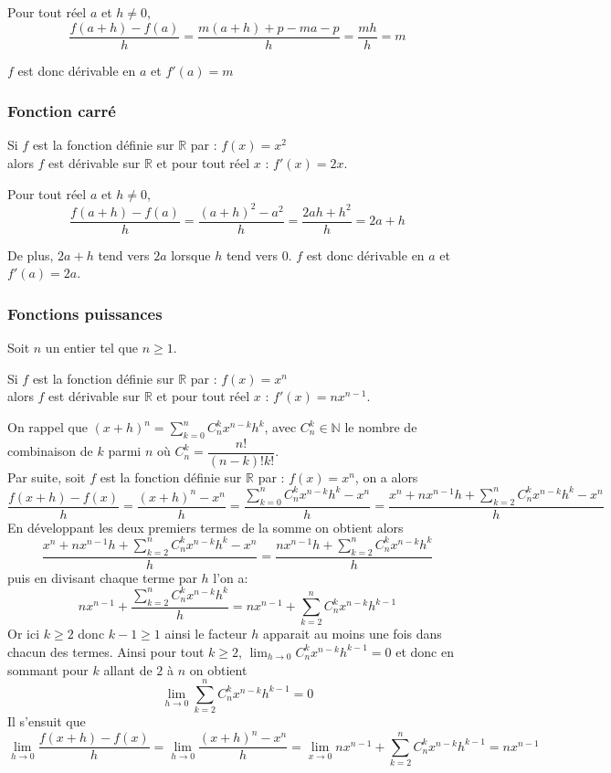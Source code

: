 \documentclass[french]{book}
\newcommand{\R}{\mathbb {R}}
\newcommand{\N}{\mathbb {N}}
\newcommand{\se}{\geq}
\newcommand{\ds}{\displaystyle}
\newcommand{\limo}[1][x]{\ds\lim_{#1\rightarrow 0}}
\begin{document}
\begin{demo}
Pour tout réel $a$ et $h\neq 0$,
\[\dfrac{f(a+h)-f(a)}{h}=\dfrac{m(a+h)+p-ma-p}{h}=\dfrac{mh}{h}=m\]

$f$ est donc dérivable en $a$ et $f'(a)=m$
\end{demo}

\subsubsection*{Fonction carré}
\begin{prop}
Si $f$ est la fonction définie sur $\R$ par :  $f(x)=x^{2}$ \\
alors $f$ est dérivable sur $\R$ et pour tout réel $x$ :  $f'(x)=2x$.

\end{prop}

\begin{demo}
Pour tout réel $a$ et $h\neq 0$,
\[\dfrac{f(a+h)-f(a)}{h}=\dfrac{(a+h)^{2}-a^{2}}{h}=\dfrac{2ah+h^{2}}{h}=2a+h\]

De plus, $2a+h$ tend vers $2a$ lorsque $h$ tend vers 0.
$f$ est donc dérivable en $a$ et $f'(a)=2a$.
\end{demo}

\subsubsection*{Fonctions puissances}
\begin{prop}
Soit $n$ un entier tel que $n \se 1$.

Si $f$ est la fonction définie sur $\R$ par :  $f(x)=x^{n}$ \\
alors $f$ est dérivable sur $\R$ et pour tout réel $x$ :  $f'(x)=nx^{n-1}$.

\end{prop}

\begin{demo}
On rappel que $(x+h)^n=\sum^n_{k=0} C^k_n x^{n-k}h^k$, avec $ C^k_n \in \N$ le nombre de combinaison de $k$ parmi $n$ où $C^k_n=\dfrac{n!}{(n-k)!k!}$.\\

Par suite,  soit $f$ est la fonction définie sur $\R$ par :  $f(x)=x^{n}$, on a alors 
$$\dfrac{f(x+h)-f(x)}{h}=\dfrac{(x+h)^n -x^n }{h}=\dfrac{\sum^n_{k=0} C^k_n x^{n-k}h^k -x^n}{h}= \dfrac{x^n+nx^{n-1}h+\sum^n_{k=2} C^k_n x^{n-k}h^k -x^n}{h}$$
En développant les deux premiers termes de la somme on obtient alors
$$\dfrac{x^n+nx^{n-1}h+\sum^n_{k=2} C^k_n x^{n-k}h^k -x^n}{h}=\dfrac{nx^{n-1}h+\sum^n_{k=2} C^k_n x^{n-k}h^k}{h}$$
puis en divisant chaque terme par $h$ l'on a:
$$nx^{n-1}+ \dfrac{\sum^n_{k=2} C^k_n x^{n-k}h^k}{h}=nx^{n-1}+\sum^n_{k=2} C^k_n x^{n-k}h^{k-1}$$
Or ici $k\se2$ donc $k-1\se1$ ainsi le facteur $h$ apparait au moins une fois dans chacun des termes. Ainsi pour tout $k\se2$,  $\limo[h] C^k_n x^{n-k}h^{k-1} = 0$ et donc en sommant pour $k$ allant de $2$ à $n$ on obtient
$$\limo[h]  \sum^n_{k=2} C^k_n x^{n-k}h^{k-1}=0$$
Il s'ensuit que 
$$ \limo[h] \dfrac{f(x+h)-f(x)}{h}=\limo[h] \dfrac{(x+h)^n -x^n }{h}= \limo nx^{n-1}+\sum^n_{k=2} C^k_n x^{n-k}h^{k-1} = nx^{n-1} $$
\end{demo}
\end{document}
